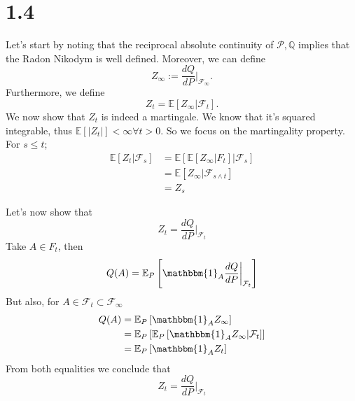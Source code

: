 \documentclass{article}
\begin{document}
\section{1.4}
Let's start by noting that the reciprocal absolute continuity of \(\mathcal{P}, \mathbb{Q}\) implies that the Radon Nikodym is well defined.
Moreover, we can define
\begin{equation}
  Z_\infty := \frac{dQ}{dP} \bigg|_{\mathcal{F}_\infty}.
\end{equation}
Furthermore, we define
\begin{equation}
  Z_t = \mathbb{E} \left[ Z_\infty  |\mathcal{F}_t \right].
\end{equation}
We now show that \(Z_t\) is indeed a martingale. We know that it's squared integrable, thus \(\mathbb{E} \left[ |Z_t| \right] <\infty  \forall t>0 \). So we focus on the martingality property.
For \(s\leq t\);
\begin{align*}
  \mathbb{E} \left[ Z_t|\mathcal{F}_s \right] & = \mathbb{E} \left[ \mathbb{E} \left[ Z_\infty |F_t \right] |\mathcal{F}_s \right] \\
                                              & = \mathbb{E} \left[ Z_\infty |\mathcal{F}_{s \wedge t} \right]                     \\
                                              & = Z_s
\end{align*}

Let's now show that
\begin{equation}
  Z_t = \frac{dQ}{dP}\bigg|_{\mathcal{F}_t}
\end{equation}
Take \(A \in  F_t\), then
\begin{equation}
  Q(A) = \mathbb{E}_P \left[ \mathbbm{1}_A \frac{dQ}{dP}\bigg|_{\mathcal{F}_t} \right]
\end{equation}
But also, for \(A \in  \mathcal{F}_t \subset \mathcal{F}_\infty  \)
\begin{align}
  Q(A) & = \mathbb{E}_P \left[ \mathbbm{1}_A Z_\infty  \right]                                           \\
       & = \mathbb{E}_P \left[ \mathbb{E}_P \left[ \mathbbm{1}_A Z_\infty |\mathcal{F}_t \right] \right] \\
       & = \mathbb{E}_P \left[ \mathbbm{1}_A  Z_t\right]
\end{align}
From both equalities we conclude that
\begin{equation}
  Z_t = \frac{dQ}{dP}\bigg|_{\mathcal{F}_t}
\end{equation}
\end{document}
